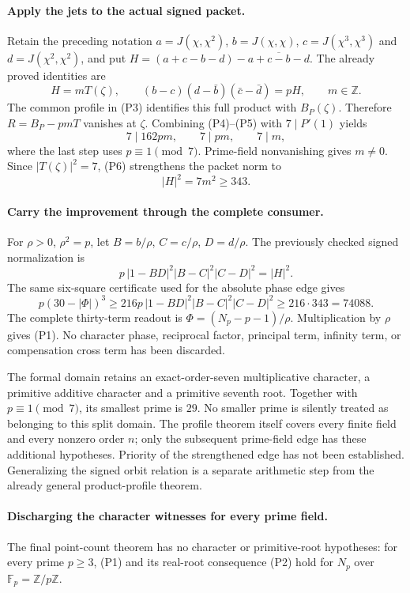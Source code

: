 \documentclass[11pt]{article}
\begin{document}
\paragraph{Apply the jets to the actual signed packet.}
Retain the preceding notation
$a=J(\chi,\chi^2)$, $b=J(\chi,\chi)$,
$c=J(\chi^3,\chi^3)$ and $d=J(\chi^2,\chi^2)$, and put
$H=(a+c-b-d)-\overline{a+c-b-d}$.
The already proved identities are
\[
 H=mT(\zeta),\qquad
 (b-c)(d-\bar b)(\bar c-\bar d)=pH,\qquad m\in\mathbb Z .
\]
The common profile in (P3) identifies this full product with
$B_P(\zeta)$. Therefore
$R=B_P-pmT$ vanishes at $\zeta$.
Combining (P4)--(P5) with $7\mid P'(1)$ yields
\[
 7\mid162pm,\qquad 7\mid pm,\qquad 7\mid m,                  \tag{P6}
\]
where the last step uses $p\equiv1\pmod7$.
Prime-field nonvanishing gives $m\ne0$. Since
$|T(\zeta)|^2=7$, (P6) strengthens the packet norm to
\[
 |H|^2=7m^2\ge343.                                         \tag{P7}
\]

\paragraph{Carry the improvement through the complete consumer.}
For $\rho>0$, $\rho^2=p$, let $B=b/\rho$, $C=c/\rho$, $D=d/\rho$.
The previously checked signed normalization is
\[
 p\,|1-BD|^2|B-C|^2|C-D|^2=|H|^2.
\]
The same six-square certificate used for the absolute phase edge gives
\[
 p(30-|\Phi|)^3
 \ge216p\,|1-BD|^2|B-C|^2|C-D|^2
 \ge216\cdot343=74088 .
\]
The complete thirty-term readout is
$\Phi=(N_p-p-1)/\rho$. Multiplication by $\rho$ gives (P1).
No character phase, reciprocal factor, principal term, infinity term,
or compensation cross term has been discarded.

The formal domain retains an exact-order-seven multiplicative
character, a primitive additive character and a primitive seventh root.
Together with $p\equiv1\pmod7$, its smallest prime is $29$.
No smaller prime is silently treated as belonging to this split domain.
The profile theorem itself covers every finite field and every
nonzero order $n$; only the subsequent prime-field edge has these
additional hypotheses. Priority of the strengthened edge has not been
established. Generalizing the signed orbit relation is a separate
arithmetic step from the already general product-profile theorem.

\paragraph{Discharging the character witnesses for every prime field.}
The final point-count theorem has no character or primitive-root hypotheses:
for every prime $p\ge3$, (P1) and its real-root consequence (P2) hold for
$N_p$ over $\mathbb F_p=\mathbb Z/p\mathbb Z$.
\end{document}
